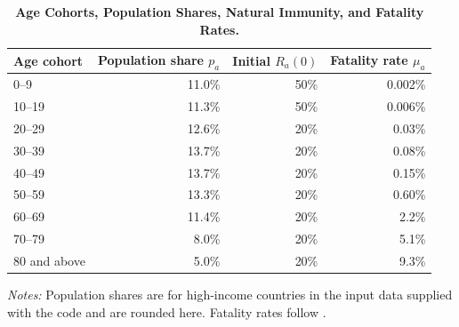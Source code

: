 \documentclass[12pt]{article}
\begin{document}
\begin{table}[htbp]
\centering
\caption{{\bf Age Cohorts, Population Shares, Natural Immunity, and Fatality Rates.}}
\label{tab:seirdv_age_cohorts}
\footnotesize
\begin{tabular*}{\textwidth}{@{\extracolsep{\fill}}lrrr@{}}
\toprule
Age cohort & Population share $p_a$ & Initial $R_a(0)$ & Fatality rate $\mu_a$ \\
\midrule
0--9   & 11.0\% & 50\% & 0.002\% \\
10--19 & 11.3\% & 50\% & 0.006\% \\
20--29 & 12.6\% & 20\% & 0.03\% \\
30--39 & 13.7\% & 20\% & 0.08\% \\
40--49 & 13.7\% & 20\% & 0.15\% \\
50--59 & 13.3\% & 20\% & 0.60\% \\
60--69 & 11.4\% & 20\% & 2.2\% \\
70--79 & 8.0\%  & 20\% & 5.1\% \\
80 and above & 5.0\% & 20\% & 9.3\% \\
\bottomrule
\end{tabular*}
\parbox{\textwidth}{\footnotesize \emph{Notes:} Population shares are for high-income
countries in the input data supplied with the code and are rounded
here. Fatality rates follow \citet{Verity2020}.}
\end{table}
\end{document}
